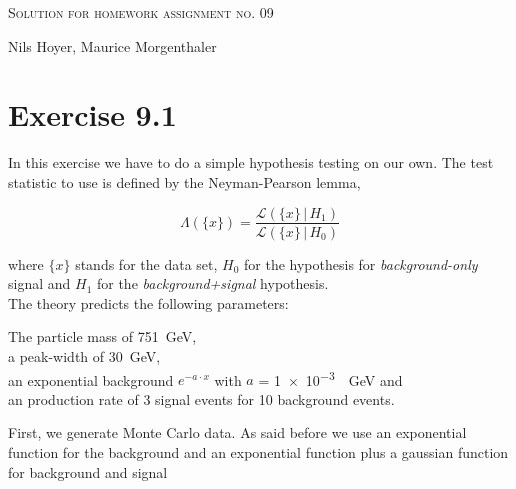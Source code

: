 \documentclass[10pt]{article}
\newenvironment{myfont}{\fontfamily{put}\selectfont}{\par}
\begin{document}
\begin{myfont}

\begin{center}
  \begin{Large}
    \textsc{Solution for homework assignment no. 09} \\
  \end{Large}
	\vspace*{0.4cm}
    Nils Hoyer, Maurice Morgenthaler
  \vspace*{1cm}
\end{center}

\section*{Exercise 9.1}

In this exercise we have to do a simple hypothesis testing on our own.
The test statistic to use is defined by the Neyman-Pearson lemma,

\begin{equation}
  \Lambda\left(\{x\}\right) = \frac{\mathcal{L}\left(\{x\}\,|\,H_{1}\right)}{\mathcal{L}\left(\{x\}\,|\,H_{0}\right)}
\end{equation}

\noindent where $\{x\}$ stands for the data set, $H_{0}$ for the hypothesis for \textit{background-only} signal and $H_{1}$ for the \textit{background+signal} hypothesis. \\
The theory predicts the following parameters: \\

\begin{adjustwidth}{0.4cm}{0.0cm}
  The particle mass of \SI{751}{\giga\electronvolt}, \\
  a peak-width of \SI{30}{\giga\electronvolt}, \\
  an exponential background $e^{-a\cdot x}$ with $a$ = \SI{1e-3}{\per\giga\electronvolt} and \\
  an production rate of \num{3} signal events for \num{10} background events. \\
\end{adjustwidth}

\noindent First, we generate Monte Carlo data.
As said before we use an exponential function for the background and an exponential function plus a gaussian function for background and signal


\end{myfont}
\end{document}
